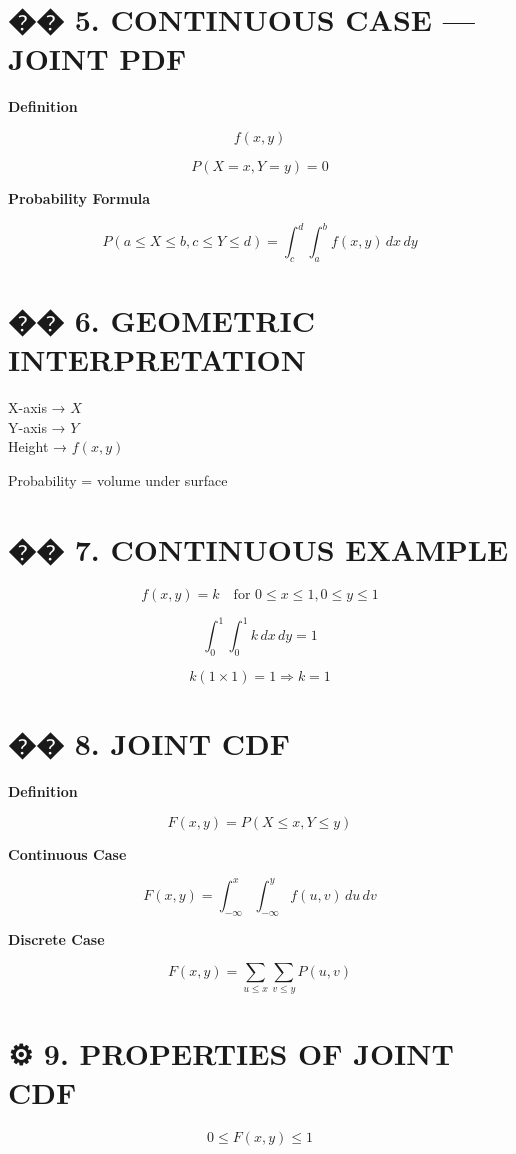 \documentclass[12pt]{article}
\begin{document}
\section*{�� 5. CONTINUOUS CASE — JOINT PDF}

\textbf{Definition}

\[
f(x,y)
\]

\[
P(X=x, Y=y) = 0
\]

\textbf{Probability Formula}

\[
P(a \leq X \leq b, c \leq Y \leq d)
= \int_c^d \int_a^b f(x,y)\,dx\,dy
\]

\section*{�� 6. GEOMETRIC INTERPRETATION}

X-axis → $X$ \\
Y-axis → $Y$ \\
Height → $f(x,y)$

Probability = volume under surface

\section*{�� 7. CONTINUOUS EXAMPLE}

\[
f(x,y) = k \quad \text{for } 0 \leq x \leq 1, 0 \leq y \leq 1
\]

\[
\int_0^1 \int_0^1 k\,dx\,dy = 1
\]

\[
k(1 \times 1) = 1 \Rightarrow k = 1
\]

\section*{�� 8. JOINT CDF}

\textbf{Definition}

\[
F(x,y) = P(X \leq x, Y \leq y)
\]

\textbf{Continuous Case}

\[
F(x,y) = \int_{-\infty}^{x} \int_{-\infty}^{y} f(u,v)\,du\,dv
\]

\textbf{Discrete Case}

\[
F(x,y) = \sum_{u \leq x} \sum_{v \leq y} P(u,v)
\]

\section*{⚙️ 9. PROPERTIES OF JOINT CDF}

\[
0 \leq F(x,y) \leq 1
\]
\end{document}
